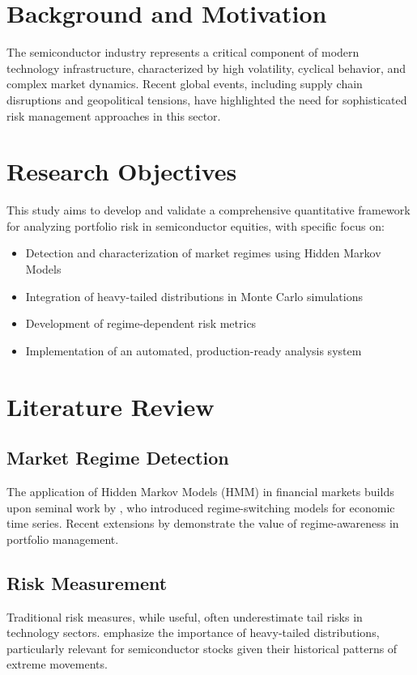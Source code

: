 \section{Background and Motivation}
The semiconductor industry represents a critical component of modern technology infrastructure, characterized by high volatility, cyclical behavior, and complex market dynamics. Recent global events, including supply chain disruptions and geopolitical tensions, have highlighted the need for sophisticated risk management approaches in this sector.

\section{Research Objectives}
This study aims to develop and validate a comprehensive quantitative framework for analyzing portfolio risk in semiconductor equities, with specific focus on:

\begin{itemize}
    \item Detection and characterization of market regimes using Hidden Markov Models
    \item Integration of heavy-tailed distributions in Monte Carlo simulations
    \item Development of regime-dependent risk metrics
    \item Implementation of an automated, production-ready analysis system
\end{itemize}

\section{Literature Review}
\subsection{Market Regime Detection}
The application of Hidden Markov Models (HMM) in financial markets builds upon seminal work by \cite{hamilton1989new}, who introduced regime-switching models for economic time series. Recent extensions by \cite{ang2012regime} demonstrate the value of regime-awareness in portfolio management.

\subsection{Risk Measurement}
Traditional risk measures, while useful, often underestimate tail risks in technology sectors. \cite{embrechts2005quantitative} emphasize the importance of heavy-tailed distributions, particularly relevant for semiconductor stocks given their historical patterns of extreme movements.

